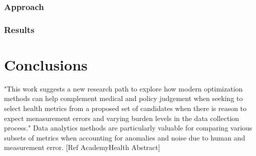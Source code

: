 \documentclass{article}
\begin{document}
\subsubsection{Approach}
\subsubsection{Results}

\section{Conclusions}

"This work suggests a new research path to explore how modern optimization methods can help complement medical and policy judgement when seeking to select health metrics from a proposed set of candidates when there is reason to expect menasurement errors and varying burden levels in the data collection process." Data analytics methods are particularly valuable for comparing various subsets of metrics when accounting for anomalies and noise due to human and measurement error. [Ref AcademyHealth Abstract]
\newpage
\listoftodos[Notes]
\end{document}
